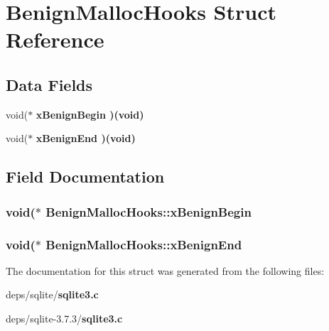 \section{Benign\-Malloc\-Hooks Struct Reference}
\label{structBenignMallocHooks}
\subsection*{Data Fields}
\begin{CompactItemize}
\item 
void($\ast$ \bf{x\-Benign\-Begin} )(void)
\item 
void($\ast$ \bf{x\-Benign\-End} )(void)
\end{CompactItemize}


\subsection{Field Documentation}
\subsubsection{\setlength{\rightskip}{0pt plus 5cm}void($\ast$ \bf{Benign\-Malloc\-Hooks::x\-Benign\-Begin}}\label{structBenignMallocHooks_3c8aa4adb0b442ff6c1769c87a9e8190}


\subsubsection{\setlength{\rightskip}{0pt plus 5cm}void($\ast$ \bf{Benign\-Malloc\-Hooks::x\-Benign\-End}}\label{structBenignMallocHooks_256631517b48e3de773b559972b513aa}




The documentation for this struct was generated from the following files:\begin{CompactItemize}
\item 
deps/sqlite/\bf{sqlite3.c}\item 
deps/sqlite-3.7.3/\bf{sqlite3.c}\end{CompactItemize}
